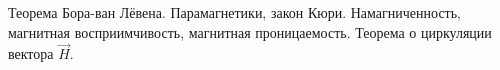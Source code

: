 \documentclass[__main__.tex]{subfiles}
\begin{document}
Теорема Бора-ван Лёвена. Парамагнетики, закон Кюри. Намагниченность, магнитная восприимчивость, магнитная проницаемость. Теорема о циркуляции вектора $\vec{H}$.\\ 

\end{document}

